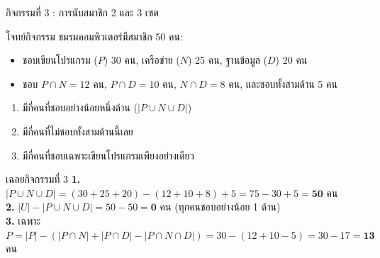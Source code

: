 \begin{frame}{กิจกรรมที่ 3 : การนับสมาชิก 2 และ 3 เซต }
  \begin{block}{โจทย์กิจกรรม}
    ชมรมคอมพิวเตอร์มีสมาชิก 50 คน:
    \begin{itemize}\small
      \item ชอบเขียนโปรแกรม ($P$) 30 คน, เครือข่าย ($N$) 25 คน, ฐานข้อมูล ($D$) 20 คน
      \item ชอบ $P \cap N = 12$ คน, $P \cap D = 10$ คน, $N \cap D = 8$ คน, และชอบทั้งสามด้าน 5 คน
    \end{itemize}
    \begin{enumerate}
      \item มีกี่คนที่ชอบอย่างน้อยหนึ่งด้าน ($|P \cup N \cup D|$)
      \item มีกี่คนที่ไม่ชอบทั้งสามด้านนี้เลย
      \item มีกี่คนที่ชอบเฉพาะเขียนโปรแกรมเพียงอย่างเดียว
    \end{enumerate}
  \end{block}
  \pause
  \begin{exampleblock}{เฉลยกิจกรรมที่ 3}
    \footnotesize
    \textbf{1.} $|P \cup N \cup D| = (30 + 25 + 20) - (12 + 10 + 8) + 5 = 75 - 30 + 5 = \mathbf{50}$ คน \\
    \textbf{2.} $|U| - |P \cup N \cup D| = 50 - 50 = \mathbf{0}$ คน (ทุกคนชอบอย่างน้อย 1 ด้าน) \\
    \textbf{3.} เฉพาะ $P = |P| - (|P \cap N| + |P \cap D| - |P \cap N \cap D|) = 30 - (12 + 10 - 5) = 30 - 17 = \mathbf{13}$ คน
  \end{exampleblock}
\end{frame}

